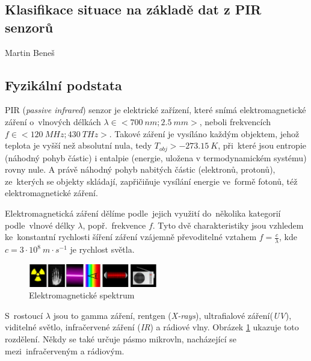 \documentclass[10pt,a4paper,titlepage]{article}
\begin{document}

  \begin{center}
    \section*{Klasifikace situace na základě dat z PIR senzorů}
    Martin Beneš
  \end{center}

  \subsection*{Fyzikální podstata}
  PIR ({\it passive infrared}) senzor je elektrické zařízení, které snímá elektromagnetické záření
  o~vlnových délkách $\lambda\in<700~nm;2.5~mm>$, neboli frekvencích $f\in<120~MHz;430~THz>$.
  Takové záření je vysíláno každým objektem, jehož teplota je vyšší než absolutní nula, tedy
  $T_{obj}>-273.15~K$, při~které jsou entropie (náhodný pohyb částic) i entalpie (energie, uložena
  v termodynamickém systému) rovny nule. A právě náhodný pohyb nabitých částic (elektronů, protonů),
  ze~kterých se objekty skládají, zapřičiňuje vysílání energie ve~formě fotonů, též elektromagnetické
  záření.

  Elektromagnetická záření dělíme podle~jejich využití do~několika kategorií podle~vlnové délky $\lambda$,
  popř.~frekvence $f$. Tyto dvě charakteristiky jsou vzhledem ke~konstantní rychlosti šíření záření
  vzájemně převoditelné vztahem $f=\frac{c}{\lambda}$, kde~$c=3\cdot10^{8}~m\cdot s^{-1}$ je rychlost světla. 

  \begin{figure}[h!]
    \begin{center}
      \includegraphics[width=0.5\textwidth]{spectrum.png}
      \caption[title=Obrazek]{Elektromagnetické spektrum\label{fig:spectrum} \cite{IZGcolors}}
    \end{center}    
  \end{figure}

  S~rostoucí $\lambda$ jsou to gamma záření, rentgen ({\it X-rays}), ultrafialové záření({\it UV}),
  viditelné světlo, infračervené záření ({\it IR}) a rádiové vlny. Obrázek \ref{fig:spectrum} ukazuje
  toto rozdělení. Někdy se také určuje pásmo mikrovln, nacházející se mezi~infračerveným a rádiovým.
\end{document}
